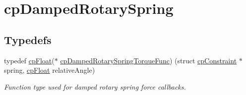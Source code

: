\hypertarget{group__cp_damped_rotary_spring}{}\section{cp\+Damped\+Rotary\+Spring}
\label{group__cp_damped_rotary_spring}
\subsection*{Typedefs}
\begin{DoxyCompactItemize}
\item 
\mbox{\label{group__cp_damped_rotary_spring_ga072c236959020fab4f30087b5234040b}} 
typedef \mbox{\hyperlink{group__basic_types_gac1ed65573e035bf892505768c852d8d3}{cp\+Float}}($\ast$ \mbox{\hyperlink{group__cp_damped_rotary_spring_ga072c236959020fab4f30087b5234040b}{cp\+Damped\+Rotary\+Spring\+Torque\+Func}}) (struct \mbox{\hyperlink{structcp_constraint}{cp\+Constraint}} $\ast$spring, \mbox{\hyperlink{group__basic_types_gac1ed65573e035bf892505768c852d8d3}{cp\+Float}} relative\+Angle)
\begin{DoxyCompactList}\small\item\em Function type used for damped rotary spring force callbacks. \end{DoxyCompactList}\end{DoxyCompactItemize}
